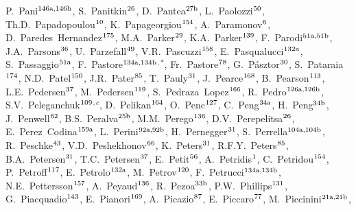 \begin{flushleft}
P.~Pani$^\textrm{\scriptsize 146a,146b}$,
S.~Panitkin$^\textrm{\scriptsize 26}$,
D.~Pantea$^\textrm{\scriptsize 27b}$,
L.~Paolozzi$^\textrm{\scriptsize 50}$,
Th.D.~Papadopoulou$^\textrm{\scriptsize 10}$,
K.~Papageorgiou$^\textrm{\scriptsize 154}$,
A.~Paramonov$^\textrm{\scriptsize 6}$,
D.~Paredes~Hernandez$^\textrm{\scriptsize 175}$,
M.A.~Parker$^\textrm{\scriptsize 29}$,
K.A.~Parker$^\textrm{\scriptsize 139}$,
F.~Parodi$^\textrm{\scriptsize 51a,51b}$,
J.A.~Parsons$^\textrm{\scriptsize 36}$,
U.~Parzefall$^\textrm{\scriptsize 49}$,
V.R.~Pascuzzi$^\textrm{\scriptsize 158}$,
E.~Pasqualucci$^\textrm{\scriptsize 132a}$,
S.~Passaggio$^\textrm{\scriptsize 51a}$,
F.~Pastore$^\textrm{\scriptsize 134a,134b}$$^{,*}$,
Fr.~Pastore$^\textrm{\scriptsize 78}$,
G.~P\'asztor$^\textrm{\scriptsize 30}$,
S.~Pataraia$^\textrm{\scriptsize 174}$,
N.D.~Patel$^\textrm{\scriptsize 150}$,
J.R.~Pater$^\textrm{\scriptsize 85}$,
T.~Pauly$^\textrm{\scriptsize 31}$,
J.~Pearce$^\textrm{\scriptsize 168}$,
B.~Pearson$^\textrm{\scriptsize 113}$,
L.E.~Pedersen$^\textrm{\scriptsize 37}$,
M.~Pedersen$^\textrm{\scriptsize 119}$,
S.~Pedraza~Lopez$^\textrm{\scriptsize 166}$,
R.~Pedro$^\textrm{\scriptsize 126a,126b}$,
S.V.~Peleganchuk$^\textrm{\scriptsize 109}$$^{,c}$,
D.~Pelikan$^\textrm{\scriptsize 164}$,
O.~Penc$^\textrm{\scriptsize 127}$,
C.~Peng$^\textrm{\scriptsize 34a}$,
H.~Peng$^\textrm{\scriptsize 34b}$,
J.~Penwell$^\textrm{\scriptsize 62}$,
B.S.~Peralva$^\textrm{\scriptsize 25b}$,
M.M.~Perego$^\textrm{\scriptsize 136}$,
D.V.~Perepelitsa$^\textrm{\scriptsize 26}$,
E.~Perez~Codina$^\textrm{\scriptsize 159a}$,
L.~Perini$^\textrm{\scriptsize 92a,92b}$,
H.~Pernegger$^\textrm{\scriptsize 31}$,
S.~Perrella$^\textrm{\scriptsize 104a,104b}$,
R.~Peschke$^\textrm{\scriptsize 43}$,
V.D.~Peshekhonov$^\textrm{\scriptsize 66}$,
K.~Peters$^\textrm{\scriptsize 31}$,
R.F.Y.~Peters$^\textrm{\scriptsize 85}$,
B.A.~Petersen$^\textrm{\scriptsize 31}$,
T.C.~Petersen$^\textrm{\scriptsize 37}$,
E.~Petit$^\textrm{\scriptsize 56}$,
A.~Petridis$^\textrm{\scriptsize 1}$,
C.~Petridou$^\textrm{\scriptsize 154}$,
P.~Petroff$^\textrm{\scriptsize 117}$,
E.~Petrolo$^\textrm{\scriptsize 132a}$,
M.~Petrov$^\textrm{\scriptsize 120}$,
F.~Petrucci$^\textrm{\scriptsize 134a,134b}$,
N.E.~Pettersson$^\textrm{\scriptsize 157}$,
A.~Peyaud$^\textrm{\scriptsize 136}$,
R.~Pezoa$^\textrm{\scriptsize 33b}$,
P.W.~Phillips$^\textrm{\scriptsize 131}$,
G.~Piacquadio$^\textrm{\scriptsize 143}$,
E.~Pianori$^\textrm{\scriptsize 169}$,
A.~Picazio$^\textrm{\scriptsize 87}$,
E.~Piccaro$^\textrm{\scriptsize 77}$,
M.~Piccinini$^\textrm{\scriptsize 21a,21b}$,

\end{flushleft}
